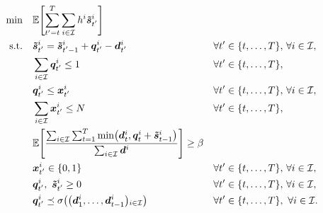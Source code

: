 \begin{subequations}\label{eq:PDP-stoch-service-level}
  \begin{align}
    \min\quad & \rlap{$\ds \espe\sqbracket{\sum_{t'=t}^{\horizon} \sum_{i\in\REF} \holding^i\va\excess_{t'}^i}$}
    \label{eq:PDP-stoch-service-level:objective}
    \\
    \st\quad & \ds \va\excess_{t'}^i = \va\excess_{t'-1}^i + \va\quantity_{t'}^i - \va\demand_{t'}^i && \forall t'\in\range[t]{\horizon},\, \forall i\in\REF,
    \label{eq:PDP-stoch-service-level:inventory-dynamic}
    \\
    & \ds \sum_{i\in\REF} \va\quantity_{t'}^i \le 1 && \forall t'\in\range[t]{\horizon},
    \label{eq:PDP-stoch-service-level:capacity}
    \\
    & \ds \va\quantity_{t'}^i \le \va\setup_{t'}^i && \forall t'\in\range[t]{\horizon},\, \forall i\in\REF,
    \label{eq:PDP-stoch-service-level:big-M}
    \\
    & \ds \sum_{i\in\REF} \va\setup_{t'}^i \le \nbsetups && \forall t'\in\range[t]{\horizon},
    \label{eq:PDP-stoch-service-level:setups}
    \\
    & \ds \espe\sqbracket{\frac{\sum_{i\in\REF}\sum_{t=1}^{\horizon} \min\bracket{\va\demand_t^i,\va\quantity_t^i+\va\excess_{t-1}^i}}{\sum_{i\in\REF}\va\demand^i}} \ge \servicelvl
    \label{eq:PDP-stoch-service-level:service-level}
    \\
    & \ds \va\setup_{t'}^i \in \crbracket{0,1} && \forall t'\in\range[t]{\horizon},\, \forall i\in\REF,
    \label{eq:PDP-stoch-service-level:binary}
    \\
    & \ds \va\quantity_{t'}^i,\ \va\excess_{t'}^i \ge 0 && \forall t'\in\range[t]{\horizon},\, \forall i\in\REF,
    \label{eq:PDP-stoch-service-level:positity}
    \\
    & \ds \va\quantity_{t'}^i \preceq \Sfield{\bracket{\va\demand_1^i,\ldots,\va\demand_{t-1}^i}_{i\in\REF}} && \forall t'\in\range[t]{\horizon},\ \forall i\in\REF.
    \label{eq:PDP-stoch-service-level:measurability}
  \end{align}
\end{subequations}

